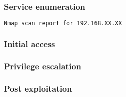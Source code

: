 

\subsubsection{Service enumeration}

\begin{lstlisting}[language=bash]
Nmap scan report for 192.168.XX.XX

\end{lstlisting}

\subsubsection{Initial access}

\subsubsection{Privilege escalation}

\subsubsection{Post exploitation}
